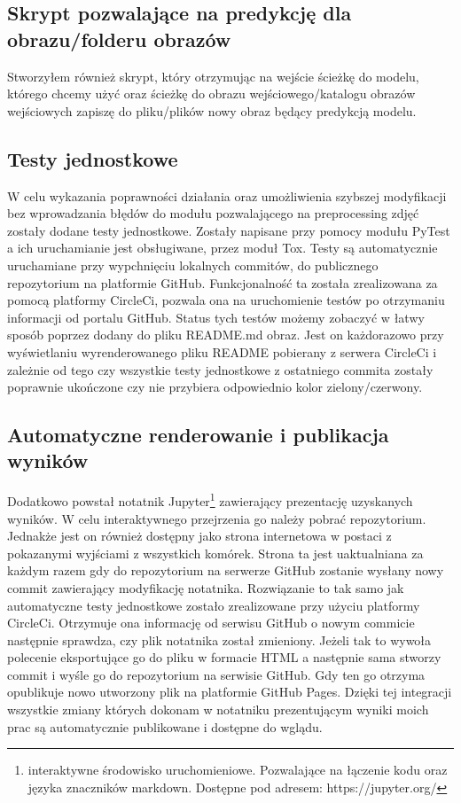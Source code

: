 \documentclass{article}
\begin{document}
\subsection{Skrypt pozwalające na predykcję dla obrazu/folderu obrazów}
Stworzyłem również skrypt, który otrzymując na wejście ścieżkę do modelu, którego chcemy użyć oraz
ścieżkę do obrazu wejściowego/katalogu obrazów wejściowych zapiszę do pliku/plików nowy obraz będący predykcją modelu.
\subsection{Testy jednostkowe}
W celu wykazania poprawności działania oraz umożliwienia szybszej modyfikacji bez wprowadzania błędów do modułu pozwalającego na preprocessing zdjęć
zostały dodane testy jednostkowe. Zostały napisane przy pomocy modułu PyTest a ich uruchamianie jest obsługiwane, przez moduł Tox.
Testy są automatycznie uruchamiane przy wypchnięciu lokalnych commitów, do publicznego repozytorium na platformie GitHub.
Funkcjonalność ta została zrealizowana za pomocą platformy CircleCi, pozwala ona na uruchomienie testów po otrzymaniu informacji od portalu GitHub.
Status tych testów możemy zobaczyć w łatwy sposób poprzez dodany do pliku README.md obraz.
Jest on każdorazowo przy wyświetlaniu wyrenderowanego pliku README pobierany z serwera CircleCi i zależnie od tego czy wszystkie testy jednostkowe z ostatniego commita zostały poprawnie ukończone czy nie przybiera odpowiednio kolor zielony/czerwony.
\subsection{Automatyczne renderowanie i publikacja wyników}
Dodatkowo powstał notatnik Jupyter\footnote{interaktywne środowisko uruchomieniowe. Pozwalające na łączenie kodu oraz języka znaczników markdown. Dostępne pod adresem: https://jupyter.org/} zawierający prezentację uzyskanych wyników.
W celu interaktywnego przejrzenia go należy pobrać repozytorium.
Jednakże jest on również dostępny jako strona internetowa w postaci z pokazanymi wyjściami z wszystkich komórek.
Strona ta jest uaktualniana za każdym razem gdy do repozytorium na serwerze GitHub zostanie wysłany nowy commit zawierający modyfikację notatnika.
Rozwiązanie to tak samo jak automatyczne testy jednostkowe zostało zrealizowane przy użyciu platformy CircleCi.
Otrzymuje ona informację od serwisu GitHub o nowym commicie następnie sprawdza, czy plik notatnika został zmieniony.
Jeżeli tak to wywoła polecenie eksportujące go do pliku w formacie HTML a następnie sama stworzy commit i wyśle go do repozytorium na serwisie GitHub.
Gdy ten go otrzyma opublikuje nowo utworzony plik na platformie GitHub Pages.
Dzięki tej integracji wszystkie zmiany których dokonam w notatniku prezentującym wyniki moich prac są automatycznie publikowane i dostępne do wglądu.
\newpage
\end{document}
